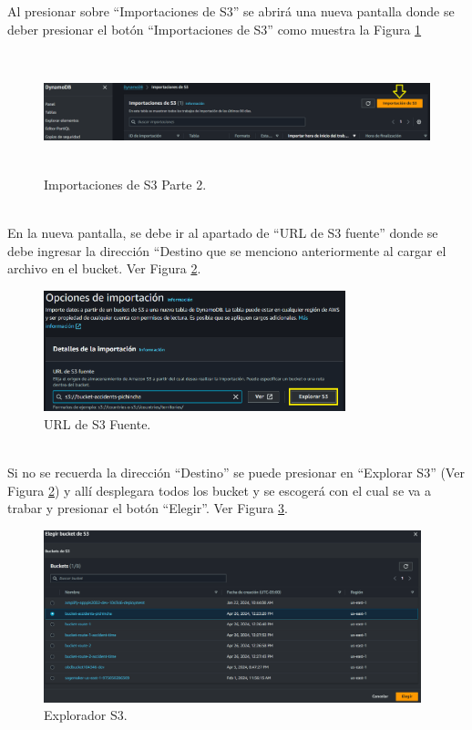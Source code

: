 \documentclass[a4paper,10pt, oneside, titlepage]{article}
\begin{document}
	\indent Al presionar sobre ``Importaciones de S3'' se abrirá una nueva pantalla donde se deber presionar el botón ``Importaciones de S3'' como muestra la Figura \ref{Importaciones_S3_Bucket_2}
	\begin{figure}[!h]
		\centering
		\includegraphics[width = 1\linewidth, height = 3.5cm]{Importaciones_S3_Bucket_2.png}
		\caption{Importaciones de S3 Parte 2.}
		\label{Importaciones_S3_Bucket_2}
	\end{figure} \\
	\indent En la nueva pantalla, se debe ir al apartado de ``URL de S3 fuente'' donde se debe ingresar la dirección ``Destino que se menciono anteriormente al cargar el archivo en el bucket. Ver Figura \ref{URL_S3_Fuente}.
	\begin{figure}[!h]
		\centering
		\includegraphics[width = 1\linewidth, height = 3.5cm]{URL_S3_Fuente.png}
		\caption{URL de S3 Fuente.}
		\label{URL_S3_Fuente}
	\end{figure} \\
	\indent Si no se recuerda la dirección ``Destino'' se puede presionar en ``Explorar S3'' (Ver Figura \ref{URL_S3_Fuente}) y allí desplegara todos los bucket y se escogerá con el cual se va a trabar y presionar el botón ``Elegir''. Ver Figura \ref{Explorador_Importaciones_S3}.
	\begin{figure}[!h]
		\centering
		\includegraphics[width = 1\linewidth, height = 5cm]{Explorador_Importaciones_S3.png}
		\caption{Explorador S3.}
		\label{Explorador_Importaciones_S3}
	\end{figure} \\
\end{document}

